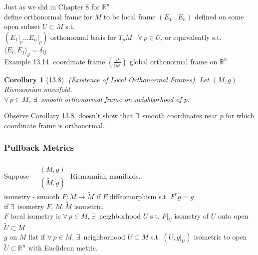 \documentclass[11pt]{amsart}
\newtheorem{corollary}{Corollary}
\theoremstyle{definition}
\begin{document}
Just as we did in Chapter 8 for $\mathbb{R}^n$ \\ %
\quad define orthonormal frame for $M$ to be local frame $(E_1 \dots E_n)$ defined on some open subset $U \subset M$ s.t. \\
\quad \quad $( \left. E_1 \right|_p \dots \left. E_n \right|_p )$ orthonormal basis for $T_pM$ \quad \, $\forall \, p \in U$, or equivalently s.t. $\langle E_i, E_j \rangle_g = \delta_{ij}$ \\

Example 13.14.  coordinate frame $\left( \frac{ \partial }{ \partial x^i} \right)$ global orthonormal frame on $\mathbb{R}^n$

\begin{corollary}[13.8] (Existence of Local Orthonormal Frames).  Let $(M,g)$ Riemannian manifold. \\
$\forall \, p \in M$, $\exists \, $ smooth orthonormal frame on neighborhood of $p$.
\end{corollary}



Observe Corollary 13.8.  doesn't show that $\exists \, $ smooth coordinates near $p$ for which coordinate frame is orthonormal. \\

\subsubsection*{Pullback Metrics}

Suppose $\begin{aligned} & \quad \\
  & (M,g) \\
  & (\widetilde{M}, \widetilde{g}) \end{aligned}$ \quad Riemannian manifolds.  \\

isometry - smooth $F: M \to \widetilde{M}$ if $F$ diffeomorphism s.t. $F^* \widetilde{g} = g$ \\
if $\exists \, $ isometry $F$, $M, \widetilde{M}$ isometric. \\
$F$ local isometry is $\forall \, p \in M$, $\exists \, $ neighborhood $U$ s.t. $\left. F \right|_U$ isometry of $U$ onto open $\widetilde{U} \subset M$ \\
$g$ on $M$ flat if $\forall \, p \in M$, $\exists \,$ neighborhood $U\subset M$ s.t. $(U , \left. g \right|_U)$ isometric to open $\widetilde{U} \subset \mathbb{R}^n$ with Euclidean metric.   \\
\end{document}
